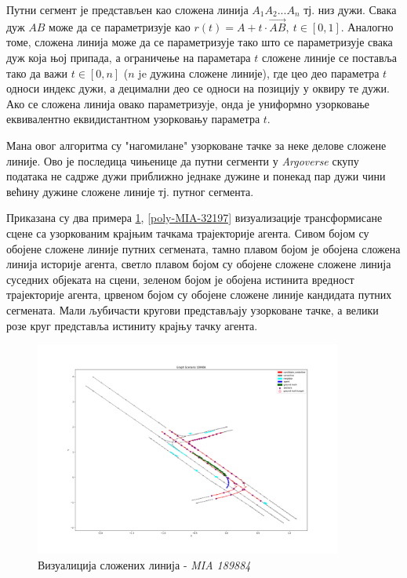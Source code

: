 \documentclass[11pt,oneside]{memoir}
\begin{document}
Путни сегмент је представљен као сложена линија $A_{1}A_{2}...A_{n}$ тј. низ дужи. Свака дуж $AB$ може да се параметризује као 
$r(t) = A + t\cdot \vec{AB},\ t \in [0, 1]$. Аналогно томе, сложена линија може да се параметризује тако што се параметризује свака дуж која њој припада,
а ограничење на параметара $t$ сложене линије се поставља тако да важи $t \in [0, n]$ ($n$ je дужина сложене линије), где цео део параметра $t$ односи индекс дужи, а децимални
део се односи на позицију у оквиру те дужи. Ако се сложена линија овако параметризује, онда је униформно узорковање еквивалентно еквидистантном узорковању
параметра $t$. 

Мана овог алгоритма су "нагомилане" узорковане тачке за неке делове сложене линије. Ово је последица чињенице да путни сегменти у \textit{Argoverse} 
скупу података не садрже дужи приближно једнаке дужине и понекад пар дужи чини већину дужине сложене линије тј. путног сегмента. 

Приказана су два примера \ref{poly-MIA-189984}, \ref{poly-MIA-32197} визуализације трансформисане сцене са узоркованим крајњим тачкама трајекторије агента.
Сивом бојом су обојене сложене линије путних сегмената, тамно плавом бојом је обојена сложена линија историје агента, светло плавом бојом су обојене сложене 
сложене линија суседних објеката на сцени, зеленом бојом је обојена истинита вредност трајекторије агента, црвеном бојом су обојене сложене линије
кандидата путних сегмената. Мали љубичасти кругови представљају узорковане тачке, а велики розе круг представља истиниту крајњу тачку агента.

\begin{figure}[H]
  \centering
  \includegraphics[width=0.9\textwidth]{images/polylines_MIA_189984.png}
  \caption{Визуалиција сложених линија - \textit{MIA 189884} \label{poly-MIA-189984}}
\end{figure}
\end{document}
